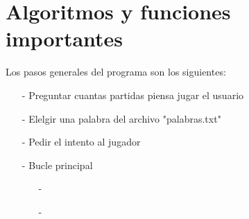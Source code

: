 \documentclass[oneside]{article}
\begin{document}
	\newpage
	\thispagestyle{fancy}	
	
	\section*{Algoritmos y funciones importantes}
	Los pasos generales del programa	son los siguientes:
	\begin{itemize}
	\item[-]Preguntar cuantas partidas piensa jugar el usuario
	\item[-]Elelgir una palabra del archivo "palabras.txt"
	\item[-]Pedir el intento al jugador
	\item[-]Bucle principal
		\begin{itemize}
		\item[-]
		\item[-]
		\end{itemize}
	\end{itemize}
	
	
	\newpage
	\thispagestyle{fancy}
\end{document}
